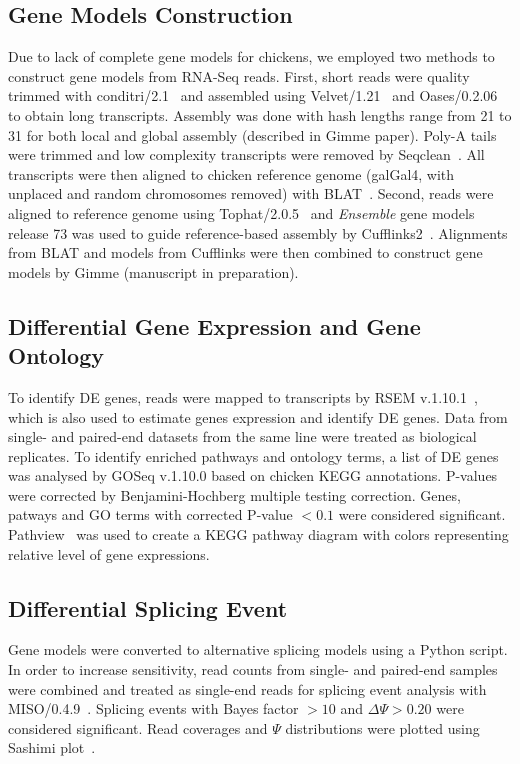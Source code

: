 \documentclass[10pt]{article}
\begin{document}
\subsection{Gene Models Construction}

Due to lack of complete gene models for chickens, we employed two methods to
construct gene models from RNA-Seq reads.
First, short reads were quality trimmed with conditri/2.1~\cite{}
and assembled using Velvet/1.21~\cite{} and Oases/0.2.06~\cite{} to obtain long transcripts.
Assembly was done with hash lengths range from 21 to 31 for both local and global assembly
(described in Gimme paper).
Poly-A tails were trimmed and low complexity transcripts were removed by Seqclean~\cite{}.
All transcripts were then aligned to chicken reference genome (galGal4, with unplaced and random 
chromosomes removed) with BLAT~\cite{}.
Second, reads were aligned to reference genome using Tophat/2.0.5~\cite{} and \textit{Ensemble} gene
models release 73 was used to guide reference-based assembly by Cufflinks2~\cite{}.
Alignments from BLAT and models from Cufflinks were then combined to construct gene models by Gimme
(manuscript in preparation).

\subsection{Differential Gene Expression and Gene Ontology}

To identify DE genes, reads were mapped to transcripts by RSEM v.1.10.1~\cite{li2011rsem}, which is
also used to estimate genes expression and identify DE genes.
Data from single- and paired-end datasets from the same line were treated as biological replicates.
To identify enriched pathways and ontology terms, a list of DE genes was analysed by GOSeq v.1.10.0 based on
chicken KEGG annotations.
P-values were corrected by Benjamini-Hochberg multiple testing correction.
Genes, patways and GO terms with corrected P-value $<0.1$ were considered significant.
Pathview~\cite{luo2013pathview} was used to create a KEGG pathway diagram with colors representing relative level of gene expressions.

\subsection{Differential Splicing Event}
Gene models were converted to alternative splicing models using a Python script.
In order to increase sensitivity, read counts from single- and paired-end samples were combined and treated
as single-end reads for splicing event analysis with MISO/0.4.9~\cite{Katz:2010iv}.
Splicing events with Bayes factor $>10$ and $\Delta\Psi>0.20$ were considered significant.
Read coverages and $\Psi$ distributions were plotted using Sashimi plot~\cite{Katz:2013vx}.
\end{document}
